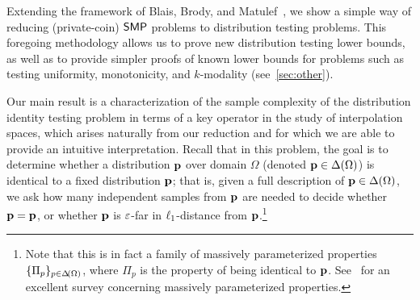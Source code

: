 Extending the framework of Blais, Brody, and Matulef~\cite{BBM:12}, we show a simple way of reducing (private-coin) $\SMP$ problems to distribution testing problems. This foregoing methodology allows us to prove new distribution testing lower bounds, as well as to provide simpler proofs of known lower bounds for problems such as testing uniformity, monotonicity, and $k$-modality (see~\cref{sec:other}). 

Our main result is a characterization of the sample complexity of the distribution identity testing problem in terms of a key operator in the study of interpolation spaces, which arises naturally from our reduction and for which we are able to provide an intuitive interpretation. Recall that in this problem, the goal is to determine whether a distribution $\q$ over domain $\Omega$ (denoted $\q\in\distribs{\Omega}$) is identical to a fixed distribution $\p$; that is, given a full description of $\p\in\distribs{\Omega}$, we ask how many independent samples from $\q$ are needed to decide whether $\q=\p$, or whether $\q$ is $\eps$-far in $\lp[1]$-distance from $\p$.\footnote{Note that this is in fact a family of massively parameterized properties $\{\Pi_p\}_{p\in\distribs{\Omega}}$, where $\Pi_p$ is the property of being identical to $\p$. See~\cite{Newman:10} for an excellent survey concerning massively parameterized properties.}

